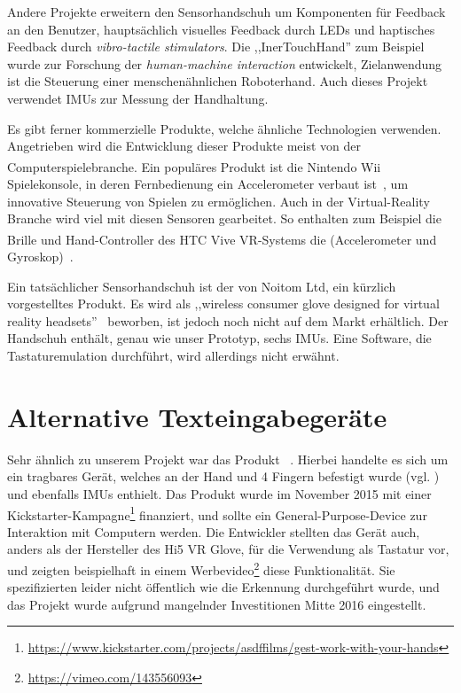 Andere Projekte erweitern den Sensorhandschuh um Komponenten für Feedback an
den Benutzer, hauptsächlich visuelles Feedback durch LEDs und haptisches
Feedback durch \emph{vibro-tactile stimulators}. Die
,,InerTouchHand'' \citep{inertouchhand} zum Beispiel wurde zur Forschung der
\emph{human-machine interaction} entwickelt, Zielanwendung ist die Steuerung
einer menschenähnlichen Roboterhand. Auch dieses Projekt verwendet IMUs zur
Messung der Handhaltung.

Es gibt ferner kommerzielle Produkte, welche ähnliche Technologien verwenden.
Angetrieben wird die Entwicklung dieser Produkte meist von der
Computerspielebranche. Ein populäres Produkt ist die Nintendo
Wii\textsuperscript{\texttrademark} Spielekonsole, in deren Fernbedienung ein
Accelerometer verbaut ist~\cite{web:wii-mote-guts}, um innovative Steuerung von
Spielen zu ermöglichen.  Auch in der Virtual-Reality Branche wird viel mit
diesen Sensoren gearbeitet. So enthalten zum Beispiel die Brille und
Hand-Controller des HTC Vive\textsuperscript{\textregistered} VR-Systems die
 (Accelerometer und
Gyroskop)~\cite{web:vive-teardown}.

Ein tatsächlicher Sensorhandschuh ist der  von Noitom
Ltd, ein kürzlich vorgestelltes Produkt. Es wird als ,,wireless consumer glove
designed for virtual reality headsets''~\cite{web:hi5vrglove} beworben, ist
jedoch noch nicht auf dem Markt erhältlich. Der Handschuh enthält, genau wie
unser Prototyp, sechs IMUs. Eine Software, die Tastatur\-emulation
durchführt, wird allerdings nicht erwähnt.

\section{Alternative Texteingabegeräte}

Sehr ähnlich zu unserem Projekt war das Produkt
~\cite{web:gest}.  Hierbei handelte es sich um ein tragbares
Gerät, welches an der Hand und 4 Fingern befestigt wurde (vgl. ) und ebenfalls IMUs
enthielt.  Das Produkt wurde im November 2015 mit einer
Kickstarter-Kampagne\footnote{\url{https://www.kickstarter.com/projects/asdffilms/gest-work-with-your-hands}}
finanziert, und sollte ein General-Purpose-Device zur Interaktion mit Computern
werden. Die Entwickler stellten das Gerät auch, anders als der Hersteller des
Hi5 VR Glove, für die Verwendung als Tastatur vor, und zeigten beispielhaft in
einem Werbevideo\footnote{\url{https://vimeo.com/143556093}} diese
Funktionalität.  Sie spezifizierten leider nicht öffentlich wie die Erkennung
durchgeführt wurde, und das Projekt wurde aufgrund mangelnder Investitionen
Mitte 2016 eingestellt.

